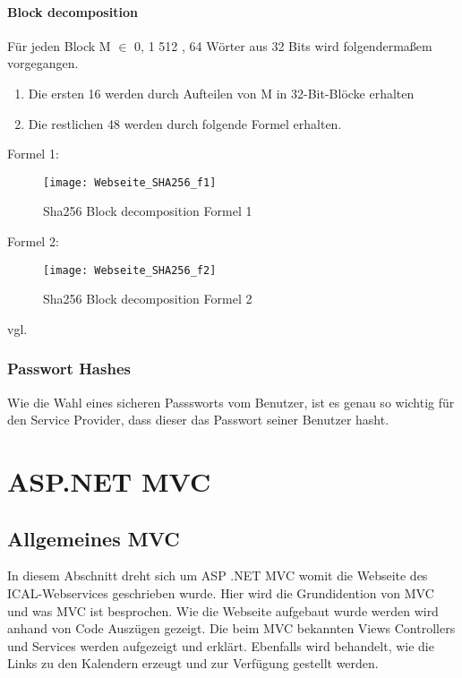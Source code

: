 {\subsubsection{Block decomposition}
\label{sec:hash_block_deco}
Für jeden Block M $\in$ {0, 1} 512 , 64 Wörter aus 32 Bits wird folgendermaßem vorgegangen. 
\begin{enumerate}
\item Die ersten 16 werden durch Aufteilen von M in 32-Bit-Blöcke erhalten
\item Die restlichen 48 werden durch folgende Formel erhalten.
\end{enumerate}
Formel 1:
\\
\begin{figure}[H]
    \texttt{[image: Webseite\_SHA256\_f1]}
    \caption{Sha256 Block decomposition Formel 1}
    \label{fig:sha256form1}
\end{figure}
Formel 2:\\
\begin{figure}[H]
    \texttt{[image: Webseite\_SHA256\_f2]}
    \caption{Sha256 Block decomposition Formel 2}
    \label{fig:sha256form2}
\end{figure}
vgl. \textcite{sha256}
\subsection{Passwort Hashes}
\label{sec:pwdhash}
Wie die Wahl eines sicheren Passsworts vom Benutzer, ist es genau so wichtig für den Service Provider, dass dieser das Passwort seiner Benutzer hasht.
\chapter{ASP.NET MVC}
\label{sec:MVC}
\section{Allgemeines MVC}
\label{sec:allgemein}
In diesem Abschnitt dreht sich um ASP .NET MVC womit die Webseite des ICAL-Webservices geschrieben wurde. Hier wird die Grundidention von MVC und was MVC ist besprochen. Wie die Webseite aufgebaut wurde werden wird anhand von Code Auszügen gezeigt. Die beim MVC bekannten Views Controllers und Services werden aufgezeigt und erklärt. Ebenfalls wird behandelt, wie die Links zu den Kalendern erzeugt und zur Verfügung gestellt werden. 
}

